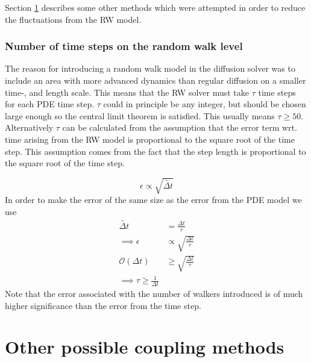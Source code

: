 Section \ref{other_possible_coupling_methods} describes some other methods which were attempted in order to reduce the fluctuations from the RW model.

\subsubsection{Number of time steps on the random walk level}
The reason for introducing a random walk model in the diffusion solver was to include an area with more advanced dynamics than regular diffusion on a smaller time-, and length scale. 
This means that the RW solver must take $\tau$ time steps for each PDE time step. 
$\tau$ could in principle be any integer, but should be chosen large enough so the central limit theorem is satisfied. 
This usually means $\tau\geq50$. \\
Alternatively $\tau$ can be calculated from the assumption that the error term wrt. time arising from the RW model is proportional to the square root of the time step. 
This assumption comes from the fact that the step length is proportional to the square root of the time step.

\begin{equation}
 \epsilon \propto \sqrt{\tilde{\Delta t}}
\end{equation}
In order to make the error of the same size as the error from the PDE model we use 
\begin{align*}
 \tilde{\Delta t} &= \frac{\Delta t}{\tau} \\
 \implies \epsilon &\propto \sqrt{\frac{\Delta t}{\tau}} \\
 \mathcal{O}(\Delta t) &\geq \sqrt{\frac{\Delta t}{\tau}} \\
 \implies \tau \geq \frac{1}{\Delta t}
\end{align*}
\noindent Note that the error associated with the number of walkers introduced is of much higher significance than the error from the time step.

\section{Other possible coupling methods}\label{other_possible_coupling_methods}

